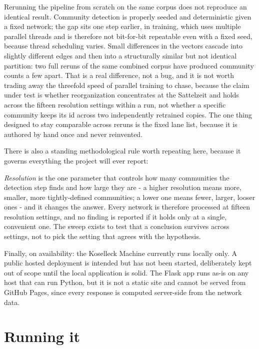 \documentclass[11pt]{article}
\begin{document}
\begin{claimbox}
 Rerunning the pipeline from scratch on the
same corpus does not reproduce an identical result. Community detection
is properly seeded and deterministic given a fixed network; the gap sits
one step earlier, in training, which uses multiple parallel threads and
is therefore not bit-for-bit repeatable even with a fixed seed, because
thread scheduling varies. Small differences in the vectors cascade into
slightly different edges and then into a structurally similar but not
identical partition: two full reruns of the same combined corpus have
produced community counts a few apart. That is a real difference, not a
bug, and it is not worth trading away the threefold speed of parallel
training to chase, because the claim under test is whether reorganization
concentrates at the Sattelzeit and holds across the fifteen resolution
settings within a run, not whether a specific community keeps its id
across two independently retrained copies. The one thing designed to stay
comparable across reruns is the fixed lane list, because it is authored by
hand once and never reinvented.
\end{claimbox}

There is also a standing methodological rule worth repeating here,
because it governs everything the project will ever report:

\begin{claimbox}
 \emph{Resolution} is the one parameter that
controls how many communities the detection step finds and how large
they are - a higher resolution means more, smaller, more tightly-defined
communities; a lower one means fewer, larger, looser ones - and it
changes the answer. Every network is therefore processed at fifteen
resolution settings, and no finding is reported if it holds only at a
single, convenient one. The sweep exists to test that a conclusion
survives across settings, not to pick the setting that agrees with the
hypothesis.
\end{claimbox}

Finally, on availability: the Koselleck Machine currently runs locally
only. A public hosted deployment is intended but has not been started,
deliberately kept out of scope until the local application is solid. The
Flask app runs as-is on any host that can run Python, but it is not a
static site and cannot be served from GitHub Pages, since every response
is computed server-side from the network data.

\section{Running it}
\end{document}
